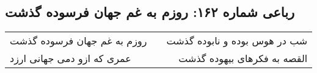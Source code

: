 \begin{center}
\section*{رباعی شماره ۱۶۲: روزم به غم جهان فرسوده گذشت}
\label{sec:sh162}
\begin{longtable}{l p{0.5cm} r}
روزم به غم جهان فرسوده گذشت
&&
شب در هوس بوده و نابوده گذشت
\\
عمری که ازو دمی جهانی ارزد
&&
القصه به فکرهای بیهوده گذشت
\\
\end{longtable}
\end{center}
